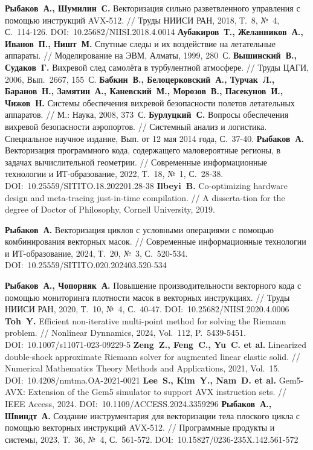 \begin{thebibliography}{99}
\textbf{Рыбаков~А., Шумилин~С.} Векторизация сильно разветвленного управления с помощью инструкций AVX-512. // Труды НИИСИ РАН, 2018, Т.~8, №~4, С.~114-126. DOI:~10.25682/NIISI.2018.4.0014
\textbf{Аубакиров~Т., Желанников~А., Иванов~П., Ништ~М.} Спутные следы и их воздействие на летательные аппараты. // Моделирование на ЭВМ, Алматы, 1999, 280~С.
\textbf{Вышинский~В., Судаков~Г.} Вихревой след самолёта в турбулентной атмосфере. // Труды ЦАГИ, 2006, Вып.~2667, 155~С.
\textbf{Бабкин~В., Белоцерковский~А., Турчак~Л., Баранов~Н., Замятин~А., Каневский~М., Морозов~В., Пасекунов~И., Чижов~Н.} Системы обеспечения вихревой безопасности полетов летательных аппаратов. // М.: Наука, 2008, 373~С.
\textbf{Бурлуцкий~С.} Вопросы обеспечения вихревой безопасности аэропортов. // Системный анализ и логистика. Специальное научное издание, Вып. от 12 мая 2014 года, С.~37-40.
\textbf{Рыбаков~А.} Векторизация программного кода, содержащего маловероятные регионы, в задачах вычислительной геометрии. // Современные информационные технологии и ИТ-образование, 2022, Т.~18, №~1, С.~28-38. DOI:~10.25559/SITITO.18.202201.28-38
\textbf{Ilbeyi~B.} Co-optimizing hardware design and meta-tracing just-in-time compilation. // A disserta-tion for the degree of Doctor of Philosophy, Cornell University, 2019.

\textbf{Рыбаков~А.} Векторизация циклов с условными операциями с помощью комбинирования векторных масок. // Современные информационные технологии и ИТ-образование, 2024, Т.~20, №~3, С.~520-534. DOI:~10.25559/SITITO.020.202403.520-534

\textbf{Рыбаков~А., Чопорняк~А.} Повышение производительности векторного кода с помощью мониторинга плотности масок в векторных инструкциях. // Труды НИИСИ РАН, 2020, Т.~10, №~4, С.~40-47. DOI:~10.25682/NIISI.2020.4.0006
\textbf{Toh~Y.} Efficient non-iterative multi-point method for solving the Riemann problem. // Nonlinear Dynnamics, 2024, Vol.~112, P.~5439-5451. DOI:~10.1007/s11071-023-09229-5
\textbf{Zeng~Z., Feng~C., Yu~C. et al.} Linearized double-shock approximate Riemann solver for augmented linear elastic solid. // Numerical Mathematics Theory Methods and Applications, 2021, Vol.~15. DOI:~10.4208/nmtma.OA-2021-0021
\textbf{Lee~S., Kim~Y., Nam~D. et al.} Gem5-AVX: Extension of the Gem5 simulator to support AVX instruction sets. // IEEE Access, 2024. DOI:~10.1109/ACCESS.2024.3359296
\textbf{Рыбаков~А., Швиндт~А.} Создание инструментария для векторизации тела плоского цикла с помощью векторных инструкций AVX-512. // Программные продукты и системы, 2023, Т.~36, №~4, С.~561-572. DOI:~10.15827/0236-235X.142.561-572




\end{thebibliography}
